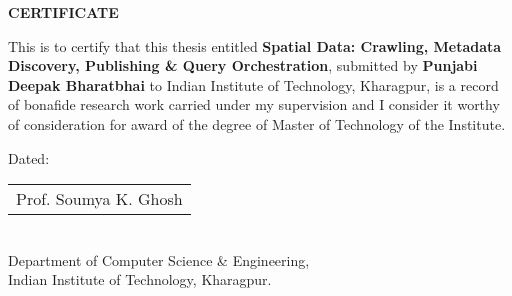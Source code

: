 \thispagestyle{plain}

\vspace*{4cm} \centerline{\Large {\textbf{CERTIFICATE}}}
\vspace*{1cm}

This is to certify that this thesis entitled \textbf{Spatial Data: Crawling, Metadata Discovery, Publishing \& Query Orchestration}, submitted by \textbf{Punjabi Deepak Bharatbhai} to Indian Institute of Technology, Kharagpur, is a record of bonafide research work carried under my supervision and I consider it worthy of consideration for award of the degree of Master of Technology of the Institute.
\vspace*{2cm}
\begin{flushleft}
\vspace{0.5cm} Dated:
\end{flushleft}
\begin{flushright}
\hspace{3cm} \begin{tabular}{l} \tabularnewline \hline Prof. Soumya K. Ghosh\tabularnewline
\end{tabular} \\
\hspace{3cm} Department of Computer Science \& Engineering,\\
\hspace{3cm} Indian Institute of Technology, Kharagpur.\\
\end{flushright}
